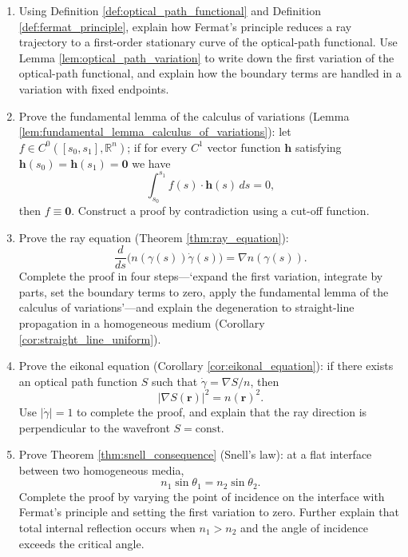\begin{enumerate}[leftmargin=3em, label=\textbf{Exercise \arabic*}]
    \item Using Definition \ref{def:optical_path_functional} and Definition \ref{def:fermat_principle},
    explain how Fermat's principle reduces a ray trajectory to a first-order stationary curve of the optical-path functional.
    Use Lemma \ref{lem:optical_path_variation} to write down the first variation of the optical-path functional,
    and explain how the boundary terms are handled in a variation with fixed endpoints.

    \item Prove the fundamental lemma of the calculus of variations (Lemma \ref{lem:fundamental_lemma_calculus_of_variations}):
    let $f\in C^0([s_0,s_1],\mathbb{R}^n)$; if for every $C^1$ vector function $\mathbf{h}$ satisfying
    $\mathbf{h}(s_0)=\mathbf{h}(s_1)=\mathbf{0}$ we have
    \[
    \int_{s_0}^{s_1}f(s)\cdot\mathbf{h}(s)\,ds=0,
    \]
    then $f\equiv\mathbf{0}$.
    Construct a proof by contradiction using a cut-off function.

    \item Prove the ray equation (Theorem \ref{thm:ray_equation}):
    \[
    \frac{d}{ds}\bigl(n(\gamma(s))\dot\gamma(s)\bigr)=\nabla n(\gamma(s)).
    \]
    Complete the proof in four steps---`expand the first variation, integrate by parts, set the boundary terms to zero,
    apply the fundamental lemma of the calculus of variations'---and
    explain the degeneration to straight-line propagation in a homogeneous medium (Corollary \ref{cor:straight_line_uniform}).

    \item Prove the eikonal equation (Corollary \ref{cor:eikonal_equation}):
    if there exists an optical path function $S$ such that $\dot\gamma=\nabla S/n$, then
    \[
    |\nabla S(\mathbf{r})|^2=n(\mathbf{r})^2.
    \]
    Use $|\dot\gamma|=1$ to complete the proof,
    and explain that the ray direction is perpendicular to the wavefront $S=\text{const}$.

    \item Prove Theorem \ref{thm:snell_consequence} (Snell's law):
    at a flat interface between two homogeneous media,
    \[
    n_1\sin\theta_1=n_2\sin\theta_2.
    \]
    Complete the proof by varying the point of incidence on the interface with Fermat's principle and
    setting the first variation to zero.
    Further explain that total internal reflection occurs when $n_1>n_2$ and the angle of incidence exceeds the critical angle.


\end{enumerate}
